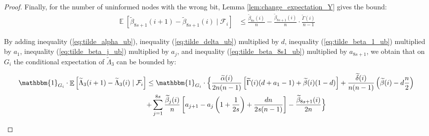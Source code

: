 \documentclass[a4paper,12pt]{article}
\DeclareMathOperator{\Ex}{\mathbb{E}}%
\begin{document}
\begin{proof}
Finally, for the number of uninformed nodes with the wrong bit, Lemma \ref{lem:change_expectation_Y} gives the bound:
\begin{align} \label{eq:tilde_beta_8s1_ub}
\Ex\left[ \widetilde{\beta}_{8s+1}(i+1) - \widetilde{\beta}_{8s+1}(i) \mid \mathcal{F}_i \right] & \leq \frac{\widetilde{\beta}_{8s}(i)}{n} -  \frac{\widetilde{\beta}_{8s+1}(i)}{n} \cdot \frac{\widetilde{\Gamma}(i)}{n-1}
\end{align}

By adding inequality (\ref{eq:tilde_alpha_ub}), inequality (\ref{eq:tilde_delta_ub}) multiplied by $d$, inequality (\ref{eq:tilde_beta_1_ub}) multiplied by $a_1$, inequality (\ref{eq:tilde_beta_j_ub}) multiplied by $a_j$, and inequality (\ref{eq:tilde_beta_8s1_ub}) multiplied by $a_{8s+1}$, we obtain that on $G_i$ the conditional expectation of $\widetilde{\Lambda}_3$ can be bounded by:
\begin{small}
\begin{align} \label{eq:lambda_3_tilde_ub}
\mathbbm{1}_{G_i} \cdot \Ex\left[ \widetilde{\Lambda}_{3}(i+1) - \widetilde{\Lambda}_{3}(i) \mid \mathcal{F}_i \right] & \leq \mathbbm{1}_{G_i} \cdot \Bigl\{ \frac{\widetilde{\alpha}(i)}{2n(n-1)}  \left[\widetilde{\Gamma}(i)  (d+a_1 - 1) + \widetilde{\beta}(i)  (1 - d) \right] + \frac{\widetilde{\delta}(i)}{n(n-1)} \left( \widetilde{\beta}(i) - d  \frac{n}{2} \right) \Bigr. \notag \\
&  \Bigl. + \sum_{j=1}^{8s} \frac{\widetilde{\beta}_j(i)}{n} \left[ a_{j+1} - a_j \left( 1 + \frac{1}{2s} \right) + \frac{dn}{2s(n-1)} \right] - \frac{\widetilde{\beta}_{8s+1}(i)}{2n} \Bigr\}
\end{align}
\end{small}


\end{proof}
\end{document}
